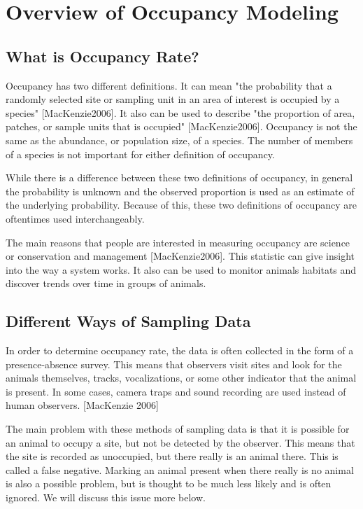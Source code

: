 \documentclass{article}
\begin{document}
\section{Overview of Occupancy Modeling}

	\subsection{What is Occupancy Rate?}

		Occupancy has two different definitions.  It can mean "the probability that a
randomly selected site or sampling unit in an area of interest is occupied by a 
species" [MacKenzie2006].  It also can be used to describe "the proportion of 
area, patches, or sample units that is occupied" [MacKenzie2006].  Occupancy is 
not the same as the abundance, or population size, of a species.  The number of
members of a species is not important for either definition of occupancy.  
	
	While there is a difference between these two definitions of occupancy, in 
general the probability is unknown and the observed proportion is used as an 
estimate of the underlying probability.  Because of this, these two definitions
of occupancy are oftentimes used interchangeably.  
		
	The main reasons that people are interested in measuring occupancy are science
or conservation and management [MacKenzie2006].  This statistic can give insight 
into the way a system works.  It also can be used to monitor animals habitats 
and discover trends over time in groups of animals.

	\subsection{Different Ways of Sampling Data}

		In order to determine occupancy rate, the data is often collected in the
 form of a presence-absence survey.  This means that observers visit sites and 
look for the animals themselves, tracks, vocalizations, or some other indicator 
that the animal is present.  In some cases, camera traps and sound recording are 
used instead of human observers. [MacKenzie 2006]

	The main problem with these methods of sampling data is that it is possible 
for an animal to occupy a site, but not be detected by the observer.  This means
that the site is recorded as unoccupied, but there really is an animal there.  
This is called a false negative.  Marking an animal present when there really is
no animal is also a possible problem, but is thought to be much less likely and 
is often ignored.  We will discuss this issue more below.
\end{document}
